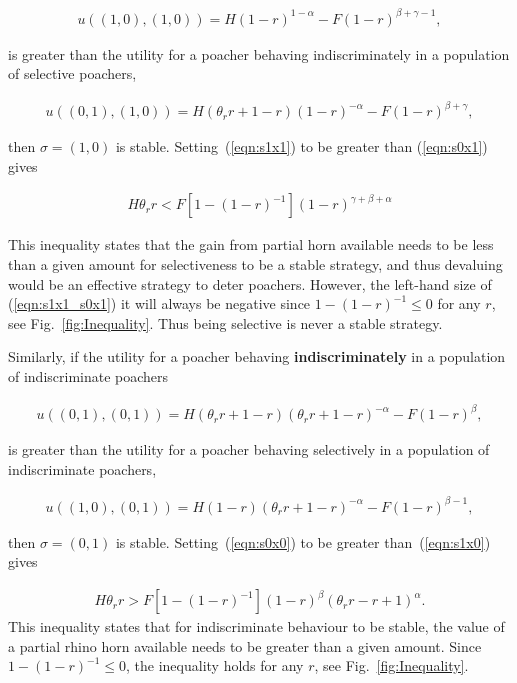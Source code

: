 \documentclass[10pt]{article}
\begin{document}
\begin{eqnarray}
\label{eqn:s1x1}
 u((1, 0),(1, 0)) = H(1 - r)^{1 - \alpha} - F(1 - r)^{\beta + \gamma - 1},
\end{eqnarray}

is greater than the utility for a poacher behaving indiscriminately in a population
of selective poachers,

\begin{eqnarray}
\label{eqn:s0x1}
u((0, 1),(1, 0)) = H(\theta_r r +1 - r)(1 - r)^{-\alpha} - F(1 - r)^{\beta + \gamma} ,
\end{eqnarray}

then \(\sigma = (1, 0)\) is stable. Setting~(\ref{eqn:s1x1}) to be greater than (\ref{eqn:s0x1})
gives

\begin{eqnarray}
\label{eqn:s1x1_s0x1}
H \theta_r r < F [1 - (1 - r)^{-1}](1 - r)^{\gamma + \beta + \alpha}
\end{eqnarray}

This inequality states that the gain from partial horn available needs to be less
than a given amount for selectiveness to be a stable strategy, and thus devaluing
would be  an effective strategy to deter poachers. However, the left-hand size 
of (\ref{eqn:s1x1_s0x1}) it will always be negative since \(1-(1-r)^{-1} \leq 0\)
for any \(r\), see Fig.~\ref{fig:Inequality}. Thus being selective is never a stable 
strategy.

Similarly, if the utility for a poacher behaving \textbf{indiscriminately} in a population
of indiscriminate poachers

\begin{eqnarray}
\label{eqn:s0x0}
 u((0, 1), (0, 1)) = H(\theta_r r + 1 - r)(\theta_r r + 1 - r)^{-\alpha}  - F(1 - r)^{\beta},
\end{eqnarray}

is greater than the utility for a poacher behaving selectively in a population of 
indiscriminate poachers,

\begin{eqnarray}
\label{eqn:s1x0}
u((1, 0),(0, 1)) = H(1 - r)(\theta_r r + 1 - r)^{-\alpha} - F(1 - r)^{\beta-1},
\end{eqnarray}

then \(\sigma = (0, 1)\) is stable. Setting~(\ref{eqn:s0x0}) to be greater 
than~(\ref{eqn:s1x0}) gives

\begin{eqnarray}
\label{eqn:s0x0_s1x0}
H \theta_r r  > F [1 - (1 - r)^{-1}](1 - r)^{\beta}(\theta_r r - r + 1)^{\alpha}.
\end{eqnarray}
This inequality states that for indiscriminate behaviour to be stable, the value of
a partial rhino horn available needs to be greater than a given amount. Since 
\(1-(1-r)^{-1} \leq 0\), the inequality holds for any \(r\), see 
Fig.~\ref{fig:Inequality}.
\end{document}
